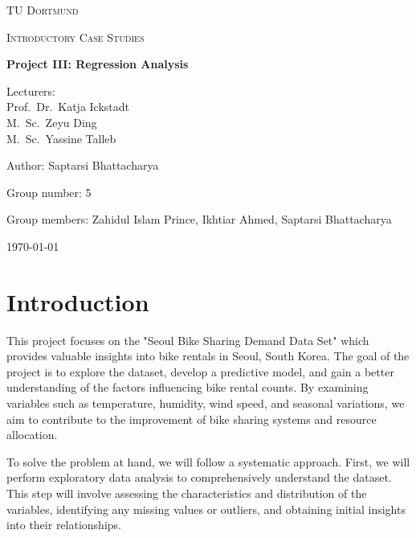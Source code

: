 \documentclass[12 pt]{scrartcl}
\begin{document}
\begin{titlepage}
	\centering
	{\scshape\LARGE TU Dortmund \par}
	\vspace{1cm}
	{\scshape\Large Introductory Case Studies \par}
	\vspace{2cm}
	{\huge\bfseries Project {III}: {Regression Analysis}\par}
	\vspace{2cm}
	{\Large Lecturers:\\
		Prof.\ Dr.\ Katja Ickstadt\\
		M.\ Sc.\ Zeyu Ding\\
		M.\ Sc.\ Yassine Talleb \par}
	\vspace{1cm}
	{\Large Author: {Saptarsi Bhattacharya} \par}
	\vspace{0.5 cm}
	{\Large Group number: {5}\par}
	\vspace{0.5 cm}
	{\Large Group members: { Zahidul Islam Prince, Ikhtiar Ahmed, Saptarsi Bhattacharya}}
	\vfill
	{\large \today\par}
\end{titlepage}



\tableofcontents
\thispagestyle{empty}

\cleardoublepage

\setcounter{page}{1}

\section{Introduction}

This project focuses on the "Seoul Bike Sharing Demand Data Set" \citep{seoul} which provides valuable insights into bike rentals in Seoul, South Korea. The goal of the project is to explore the dataset, develop a predictive model, and gain a better understanding of the factors influencing bike rental counts. By examining variables such as temperature, humidity, wind speed, and seasonal variations, we aim to contribute to the improvement of bike sharing systems and resource allocation. 

To solve the problem at hand, we will follow a systematic approach. First, we will perform exploratory data analysis to comprehensively understand the dataset. This step will involve assessing the characteristics and distribution of the variables, identifying any missing values or outliers, and obtaining initial insights into their relationships. 
\end{document}
